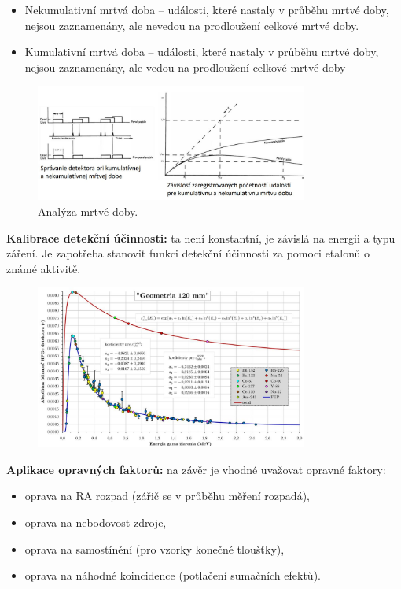 \begin{itemize}
    \item Nekumulativní mrtvá doba -- události, které nastaly v průběhu mrtvé doby, nejsou zaznamenány, ale nevedou na prodloužení celkové mrtvé doby.
    \item Kumulativní mrtvá doba -- události, které nastaly v průběhu mrtvé doby, nejsou zaznamenány, ale vedou na prodloužení celkové mrtvé doby
\end{itemize}

\begin{figure}[H]
    \centering
    \includegraphics[width=0.8\textwidth]{img/mrtva_doba.JPG}
    \caption{Analýza mrtvé doby.}
\end{figure}

\textbf{Kalibrace detekční účinnosti:} ta není konstantní, je závislá na energii a typu záření. Je zapotřeba stanovit funkci detekční účinnosti za pomoci etalonů o známé aktivitě.

\begin{figure}[H]
    \centering
    \includegraphics[width=0.8\textwidth]{img/detekcni_krivka.JPG}
\end{figure}

\textbf{Aplikace opravných faktorů:} na závěr je vhodné uvažovat opravné faktory:

\begin{itemize}
    \item oprava na RA rozpad (zářič se v průběhu měření rozpadá),
    \item oprava na nebodovost zdroje,
    \item oprava na samostínění (pro vzorky konečné tloušťky),
    \item oprava na náhodné koincidence (potlačení sumačních efektů).
\end{itemize}

